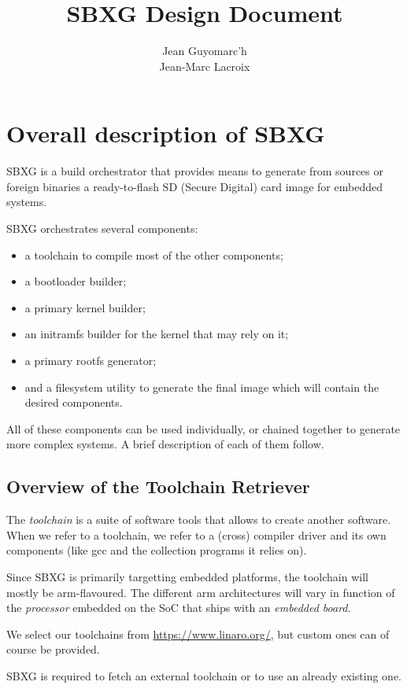 \documentclass{article}
\title{SBXG Design Document}
\date{}
\author{%
  Jean Guyomarc'h%
  \\Jean-Marc Lacroix%
}
\begin{document}
\maketitle
\tableofcontents
\clearpage

\section{Overall description of SBXG}

SBXG is a build orchestrator that provides means to generate from sources or
foreign binaries a ready-to-flash SD (Secure Digital) card image for embedded systems.

SBXG orchestrates several components:
\begin{itemize}
\item a toolchain to compile most of the other components;
\item a bootloader builder;
\item a primary kernel builder;
\item an initramfs builder for the kernel that may rely on it;
\item a primary rootfs generator;
\item and a filesystem utility to generate the final image which will contain the
  desired components.
\end{itemize}

All of these components can be used individually, or chained together to
generate more complex systems. A brief description of each of them follow.

\subsection{Overview of the Toolchain Retriever}

The \emph{toolchain} is a suite of software tools that allows to create another
software. When we refer to a toolchain, we refer to a (cross) compiler driver
and its own components (like gcc and the collection programs it relies on).

Since SBXG is primarily targetting embedded platforms, the toolchain will mostly
be arm-flavoured. The different arm architectures will vary in function of the
\emph{processor} embedded on the SoC that ships with an \emph{embedded board}.

We select our toolchains from \url{https://www.linaro.org/}, but custom ones can
of course be provided.

\begin{requirement}
  SBXG is required to fetch an external toolchain or to use an already existing
  one.
\end{requirement}
\end{document}
